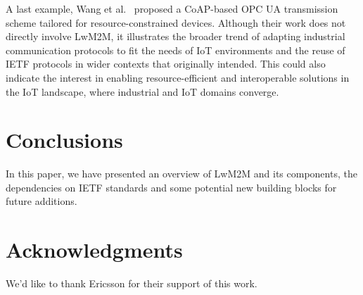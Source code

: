 \documentclass[11pt,sigconf]{iabart}
\begin{document}
A last example, Wang et al.~\cite{pop00015} proposed a CoAP-based OPC UA transmission scheme tailored for resource-constrained devices. Although their work does not directly involve LwM2M, it illustrates the broader trend of adapting industrial communication protocols to fit the needs of IoT environments and the reuse of IETF protocols in wider contexts that originally intended. This could also indicate the interest in enabling resource-efficient and interoperable solutions in the IoT landscape, where industrial and IoT domains converge.

\section{Conclusions} \label{conclusions}

In this paper, we have presented an overview of LwM2M and its components, the dependencies on IETF standards and some potential new building blocks for future additions. 

\section{Acknowledgments}

We'd like to thank Ericsson for their support of this work.



\end{document}
